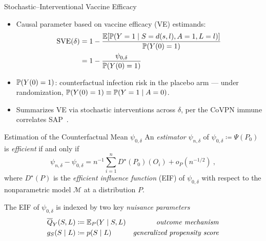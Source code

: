 \documentclass{beamer}
\begin{document}

\begin{frame}[c]{Stochastic--Interventional Vaccine Efficacy}

\begin{center}
\begin{itemize}
  \itemsep8pt
  \item Causal parameter based on vaccine efficacy (VE) estimands:
  \begin{align*}
    \text{SVE}(\delta) &= 1 - \frac{\mathbb{E}[\mathbb{P}(Y = 1 \mid S = d(s, l), A = 1,
                                    L = l)]}{\mathbb{P}(Y(0)=1)} \\
                       &= 1 - \frac{\psi_{0, \delta}}{\mathbb{P}(Y(0)=1)}
  \end{align*}
  \item $\mathbb{P}(Y(0)=1)$: counterfactual infection risk in the placebo arm ---
    under randomization, $\mathbb{P}(Y(0)=1) \equiv \mathbb{P}(Y=1 \mid A=0)$.
  \item Summarizes VE via stochastic interventions across $\delta$, per the
    CoVPN immune correlates SAP\footnotemark~\citep{gilbert2021covpn,
    gilbert2021immune}.
\end{itemize}
\end{center}

\note{
}


\end{frame}




\begin{frame}{Estimation of the Counterfactual Mean $\psi_{0,\delta}$}
An \textit{estimator} $\psi_{n,\delta}$ of $\psi_{0,\delta} \coloneqq \Psi(P_0)$
is \textit{efficient} if and only if
\[
  \psi_{n,\delta} - \psi_{0, \delta} = n^{-1} \sum\limits_{i=1}^n
  D^{\star}(P_0)(O_i) + o_P(n^{-1/2}) \ ,
\]
where $D^{\star}(P)$ is the \textit{efficient influence function} (EIF) of
$\psi_{0,\delta}$ with respect to the nonparametric model $\mathcal{M}$ at a
distribution $P$.
\vspace{0.25cm}

The EIF of $\psi_{0,\delta}$ is indexed by two key \textit{nuisance parameters}
\begin{align*}
  \overline{Q}_{Y}(S,L) &\coloneqq \mathbb{E}_{P}(Y \mid S, L) &
      \mbox{\textit{outcome mechanism}} \\
  g_{S}(S \mid L) &\coloneqq p(S \mid L) &
    \mbox{\textit{generalized propensity score}}
\end{align*}

\note{
}

\end{frame}
\end{document}

